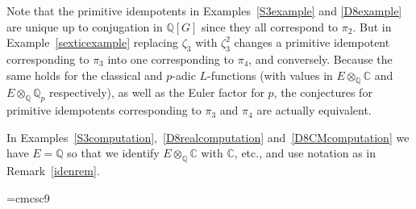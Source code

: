 \documentclass{amsart}
\begin{document}
Note that the primitive idempotents in Examples~\ref{S3example} and \ref{D8example} are unique up to
conjugation in $ {\mathbb Q}[G] $ since they all correspond to $ \pi_2 $.  But in Example~\ref{sexticexample}
replacing $ {\zeta}_3 $ with $ {\zeta}_3^2 $ changes a primitive idempotent corresponding to $ \pi_3 $ into
one corresponding to $ \pi_4 $, and conversely.  Because the same holds for the 
classical and {$p$-adic{\futurelet{}}} {$L$-functions{\futurelet{}}}{} (with values in
$ E {\otimes}_{\mathbb Q} {\mathbb C} $ and $ E {\otimes}_{\mathbb Q} {{\mathbb Q_p}} $ respectively), as well as the Euler factor for $ p $, the
conjectures for primitive idempotents corresponding to $ \pi_3 $ and $ \pi_4 $ are actually equivalent.

In Examples~\ref{S3computation},~\ref{D8realcomputation} and~\ref{D8CMcomputation} we have $ E={\mathbb Q} $ so
that we identify $ E{\otimes}_{\mathbb Q} {\mathbb C} $ with $ {\mathbb C} $, etc., and use notation as in Remark~\ref{idenrem}.

\newcount\ncount

\long

\font\tablefont=cmcsc9
\end{document}
